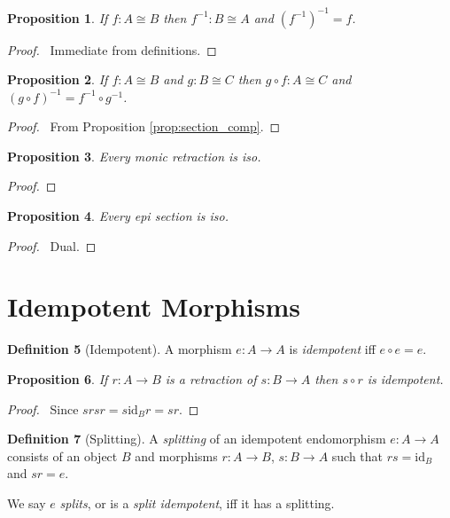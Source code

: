 \documentclass{book}
\let\qed\relax
\newtheorem{prop}{Proposition}[chapter]
\theoremstyle{definition}
\newtheorem{df}[prop]{Definition}
\newcommand{\id}[1]{\ensuremath{\mathrm{id}_{#1}}}
\begin{document}
\begin{prop}
If $f : A \cong B$ then $f^{-1} : B \cong A$ and $(f^{-1})^{-1} = f$.
\end{prop}

\begin{proof}
\pf\ Immediate from definitions. \qed
\end{proof}

\begin{prop}
If $f : A \cong B$ and $g : B \cong C$ then $g \circ f : A \cong C$ and $(g \circ f)^{-1} = f^{-1} \circ g^{-1}$.
\end{prop}

\begin{proof}
\pf\ From Proposition \ref{prop:section_comp}. \qed
\end{proof}

\begin{prop}
Every monic retraction is iso.
\end{prop}

\begin{proof}
\pf
{}
\step{3}{$sr = \id{A}$}
\qed
\end{proof}

\begin{prop}
Every epi section is iso.
\end{prop}

\begin{proof}
\pf\ Dual. \qed
\end{proof}

\section{Idempotent Morphisms}

\begin{df}[Idempotent]
A morphism $e : A \rightarrow A$ is \emph{idempotent} iff $e \circ e = e$.
\end{df}

\begin{prop}
If $r : A \rightarrow B$ is a retraction of $s : B \rightarrow A$ then $s \circ r$ is idempotent.
\end{prop}

\begin{proof}
\pf\ Since $srsr = s \id{B} r = sr$. \qed
\end{proof}

\begin{df}[Splitting]
A \emph{splitting} of an idempotent endomorphism $e : A \rightarrow A$ consists of an object $B$ and morphisms $r : A \rightarrow B$, $s : B \rightarrow A$ such that $rs = \id{B}$ and $sr = e$.

We say $e$ \emph{splits}, or is a \emph{split idempotent}, iff it has a splitting.
\end{df}
\end{document}
